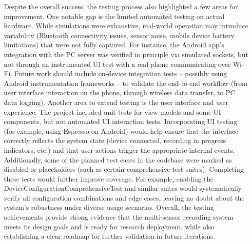 \documentclass[11pt,a4paper]{report}
\begin{document}
Despite the overall success, the testing process also highlighted a few areas for improvement. One notable gap is the limited automated testing on actual hardware. While simulations were exhaustive, real-world operation may introduce variability (Bluetooth connectivity issues, sensor noise, mobile device battery limitations) that were not fully captured. For instance, the Android app's integration with the PC server was verified in principle via simulated sockets, but not through an instrumented UI test with a real phone communicating over Wi-Fi. Future work should include on-device integration tests – possibly using Android instrumentation frameworks – to validate the end-to-end workflow (from user interface interaction on the phone, through wireless data transfer, to PC data logging). Another area to extend testing is the user interface and user experience. The project included unit tests for view-models and some UI components, but not automated UI interaction tests. Incorporating UI testing (for example, using Espresso on Android) would help ensure that the interface correctly reflects the system state (device connected, recording in progress indicators, etc.) and that user actions trigger the appropriate internal events. Additionally, some of the planned test cases in the codebase were marked as disabled or placeholders (such as certain comprehensive test suites). Completing these tests would further improve coverage. For example, enabling the DeviceConfigurationComprehensiveTest and similar suites would systematically verify all configuration combinations and edge cases, leaving no doubt about the system's robustness under diverse usage scenarios. Overall, the testing achievements provide strong evidence that the multi-sensor recording system meets its design goals and is ready for research deployment, while also establishing a clear roadmap for further validation in future iterations.



\end{document}
